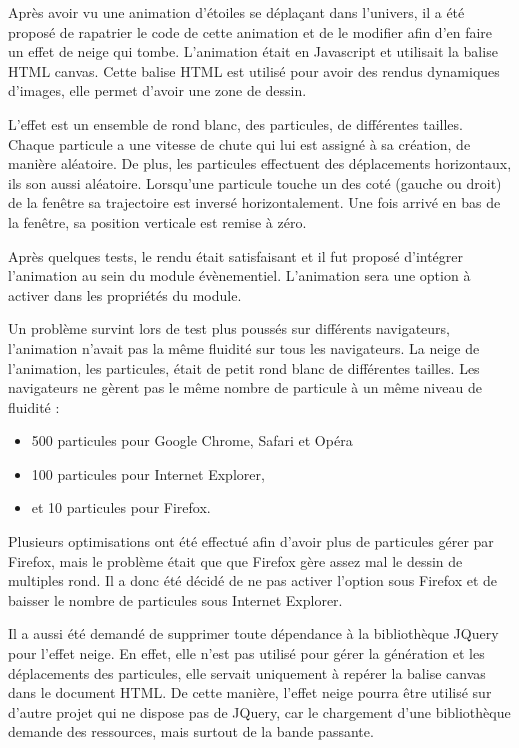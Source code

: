 \documentclass[12pt,a4paper]{article}
\begin{document}
\bigskip
Après avoir vu une animation d'étoiles se déplaçant dans l'univers, il a été proposé de rapatrier le code de cette animation et de le modifier afin d'en faire un effet de neige qui tombe. L'animation était en Javascript et utilisait la balise HTML canvas. Cette balise HTML est utilisé pour avoir des rendus dynamiques d'images, elle permet d'avoir une zone de dessin.\par 
L'effet est un ensemble de rond blanc, des particules, de différentes tailles. Chaque particule a une vitesse de chute qui lui est assigné à sa création, de manière aléatoire. De plus, les particules effectuent des déplacements horizontaux, ils son aussi aléatoire. Lorsqu'une particule touche un des coté (gauche ou droit) de la fenêtre sa trajectoire est inversé horizontalement. Une fois arrivé en bas de la fenêtre, sa position verticale est remise à zéro.\par
Après quelques tests, le rendu était satisfaisant et il fut proposé d'intégrer l'animation au sein du module évènementiel. L'animation sera une option à activer dans les propriétés du module.\par 
Un problème survint lors de test plus poussés sur différents navigateurs, l'animation n'avait pas la même fluidité sur tous les navigateurs. La neige de l'animation, les particules, était de petit rond blanc de différentes tailles. Les navigateurs ne gèrent pas le même nombre de particule à un même niveau de fluidité :
\begin{itemize}
\item 500 particules pour Google Chrome, Safari et Opéra
\item 100 particules pour Internet Explorer,
\item et 10 particules pour Firefox.
\end{itemize}\par 
Plusieurs optimisations ont été effectué afin d'avoir plus de particules gérer par Firefox, mais le problème était que que Firefox gère assez mal le dessin de multiples rond. Il a donc été décidé de ne pas activer l'option sous Firefox et de baisser le nombre de particules sous Internet Explorer.\par 
\medskip
Il a aussi été demandé de supprimer toute dépendance à la bibliothèque JQuery pour l'effet neige. En effet, elle n'est pas utilisé pour gérer la génération et les déplacements des particules, elle servait uniquement à repérer la balise canvas dans le document HTML. De cette manière, l'effet neige pourra être utilisé sur d'autre projet qui ne dispose pas de JQuery, car le chargement d'une bibliothèque demande des ressources, mais surtout de la bande passante.\par
\end{document}
